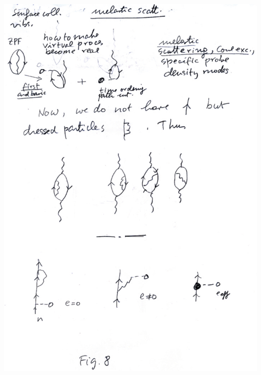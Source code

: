 \documentclass[a4paper,onecolumn,superscriptaddress,12pt,nofootinbib,twoside,raggedfooter,notitlepage]{revtex4-1}
\begin{document}
\begin{center}
	\includegraphics[width=0.98\textwidth]{figs/fig_i6}
\end{center}
\end{document}
